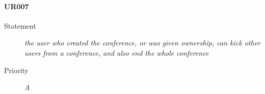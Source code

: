 \paragraph{UR007}
\begin{description}
  \item [Statement] 
    \textit{ the user who created the conference, or was given ownership, can kick other users from a conference, and also end the whole conference}
  \item [Priority] \textit{A}
\end{description}


